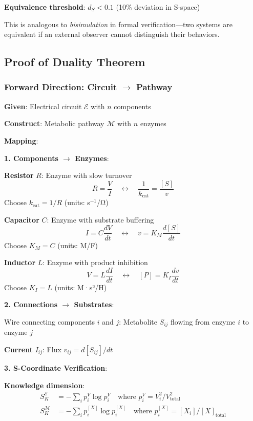 \documentclass[11pt,a4paper]{article}
\begin{document}
\textbf{Equivalence threshold}: $d_S < 0.1$ (10\% deviation in S-space)

This is analogous to \textit{bisimulation} in formal verification—two systems are equivalent if an external observer cannot distinguish their behaviors.

\subsection{Proof of Duality Theorem}

\subsubsection{Forward Direction: Circuit $\to$ Pathway}

\textbf{Given}: Electrical circuit $\mathcal{E}$ with $n$ components

\textbf{Construct}: Metabolic pathway $\mathcal{M}$ with $n$ enzymes

\textbf{Mapping}:

\textbf{1. Components $\to$ Enzymes}:

\textbf{Resistor} $R$: Enzyme with slow turnover
\begin{equation}
R = \frac{V}{I} \quad \longleftrightarrow \quad \frac{1}{k_{\text{cat}}} = \frac{[S]}{v}
\end{equation}
Choose $k_{\text{cat}} = 1/R$ (units: s$^{-1}$/Ω)

\textbf{Capacitor} $C$: Enzyme with substrate buffering
\begin{equation}
I = C \frac{dV}{dt} \quad \longleftrightarrow \quad v = K_M \frac{d[S]}{dt}
\end{equation}
Choose $K_M = C$ (units: M/F)

\textbf{Inductor} $L$: Enzyme with product inhibition
\begin{equation}
V = L \frac{dI}{dt} \quad \longleftrightarrow \quad [P] = K_I \frac{dv}{dt}
\end{equation}
Choose $K_I = L$ (units: M·s²/H)

\textbf{2. Connections $\to$ Substrates}:

Wire connecting components $i$ and $j$: Metabolite $S_{ij}$ flowing from enzyme $i$ to enzyme $j$

\textbf{Current} $I_{ij}$: Flux $v_{ij} = d[S_{ij}]/dt$

\textbf{3. S-Coordinate Verification}:

\textbf{Knowledge dimension}:
\begin{align}
S_K^{\mathcal{E}} &= -\sum_i p_i^V \log p_i^V \quad \text{where } p_i^V = V_i^2 / V_{\text{total}}^2 \\
S_K^{\mathcal{M}} &= -\sum_i p_i^{[X]} \log p_i^{[X]} \quad \text{where } p_i^{[X]} = [X_i] / [X]_{\text{total}}
\end{align}
\end{document}
